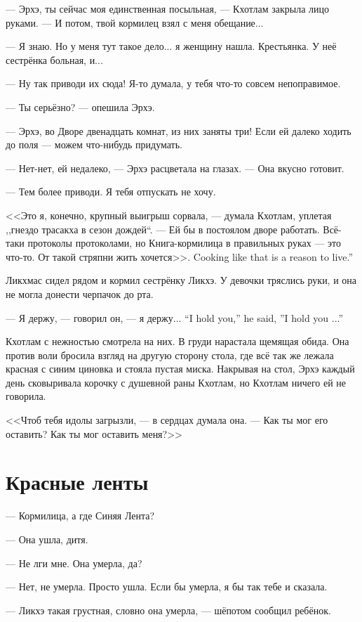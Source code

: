 --- Эрхэ, ты сейчас моя единственная посыльная, --- Кхотлам закрыла лицо руками.
--- И потом, твой кормилец взял с меня обещание...

--- Я знаю.
Но у меня тут такое дело... я женщину нашла.
Крестьянка.
У неё сестрёнка больная, и...

--- Ну так приводи их сюда!
Я-то думала, у тебя что-то совсем непоправимое.

--- Ты серьёзно? --- опешила Эрхэ.

--- Эрхэ, во Дворе двенадцать комнат, из них заняты три!
Если ей далеко ходить до поля --- можем что-нибудь придумать.

--- Нет-нет, ей недалеко, --- Эрхэ расцветала на глазах.
--- Она вкусно готовит.

--- Тем более приводи.
Я тебя отпускать не хочу.

<<Это я, конечно, крупный выигрыш сорвала, --- думала Кхотлам, уплетая ,,гнездо трасакха в сезон дождей``.
--- Ей бы в постоялом дворе работать.
Всё-таки протоколы протоколами, но Книга-кормилица в правильных руках --- это что-то.
{От такой стряпни жить хочется>>.}
{Cooking like that is a reason to live.''}

Ликхмас сидел рядом и кормил сестрёнку Ликхэ.
У девочки тряслись руки, и она не могла донести черпачок до рта.

{--- Я держу, --- говорил он, --- я держу...}
{``I hold you,'' he said, ''I hold you ...''}

Кхотлам с нежностью смотрела на них.
В груди нарастала щемящая обида.
Она против воли бросила взгляд на другую сторону стола, где всё так же лежала красная с синим циновка и стояла пустая миска.
Накрывая на стол, Эрхэ каждый день сковыривала корочку с душевной раны Кхотлам, но Кхотлам ничего ей не говорила.

<<Чтоб тебя идолы загрызли, --- в сердцах думала она.
--- Как ты мог его оставить?
Как ты мог оставить меня?>>

\section{Красные ленты}

--- Кормилица, а где Синяя Лента?

--- Она ушла, дитя.

--- Не лги мне.
Она умерла, да?

--- Нет, не умерла.
Просто ушла.
Если бы умерла, я бы так тебе и сказала.

--- Ликхэ такая грустная, словно она умерла, --- шёпотом сообщил ребёнок.

